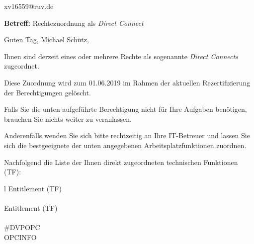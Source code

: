 \documentclass[a4paper,landscape,12pt]{letter}
\begin{document}
\begin{letter}{xv16559@ruv.de\hfill \break}
\begin{normalsize}
	\opening{\textbf{Betreff:} Rechtezuordnung als \emph{Direct Connect}}
	\begin{normalsize} \hfill
	\end{normalsize}

	\begin{normalsize}
		Guten Tag, 
	Michael Schütz, \hfill \break
	\end{normalsize}
	\end{normalsize}
	
\begin{normalsize}
	Ihnen sind derzeit eines oder mehrere Rechte als sogenannte \emph{Direct Connects} zugeordnet.
	
	Diese Zuordnung wird zum 01.06.2019 im Rahmen der aktuellen Rezertifizierung der Berechtigungen gelöscht.
	
	Falls Sie die unten aufgeführte Berechtigung nicht für Ihre Aufgaben benötigen, 
	brauchen Sie nichts weiter zu veranlassen.
	
	Anderenfalls wenden Sie sich bitte rechtzeitig an Ihre IT-Betreuer 
	und lassen Sie sich die bestgeeignete der unten angegebenen Arbeitsplatzfunktionen zuordnen.
	\end{normalsize}
	
\begin{normalsize}
	Nachfolgend die Liste der Ihnen direkt zugeordneten technischen Funktionen (TF):

	\begin{longtable}{l}
		Entitlement (TF) \\ \hline
		\endfirsthead
		\\\hline
		Entitlement (TF) \\ \hline
		\endhead %
		\multicolumn{1}{r@{}}{Fortsetzung \ldots}\\
		\endfoot
		\hline
		\endlastfoot
	\#DVPOPC\\OPCINFO\\
	\end{longtable}
	\end{normalsize}
	

\end{letter}
\end{document}
